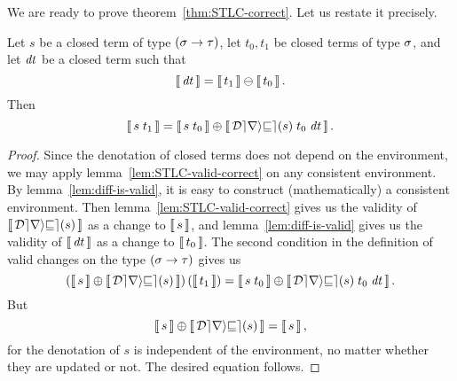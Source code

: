 We are ready to prove theorem~\ref{thm:STLC-correct}. Let us
restate it precisely.

\begin{theorem}
Let $s$ be a closed term of type $(\sigma\to\tau)$, let $t_0,t_1$ be
closed terms of type $\sigma$, and let $\mathit{dt}$ be a closed term
such that
\[
\mean{\D t} = \Diff{\mean{t_1}}{\mean{t_0}}.
\]
Then
\[
\mean{\App s {t_1}} =
\Apply{\mean{\App{\App{\Derive s}{t_0}}{\D t}}}
      {\mean{\App s {t_0}}}.
\]
\end{theorem}

\begin{proof}
Since the denotation of closed terms does not depend on the
environment, we may apply lemma~\ref{lem:STLC-valid-correct} on
any consistent environment. By lemma~\ref{lem:diff-is-valid}, it
is easy to construct (mathematically) a consistent environment.
Then lemma~\ref{lem:STLC-valid-correct} gives us the validity of
$\mean{\Derive s}$ as a change to $\mean s$, and
lemma~\ref{lem:diff-is-valid} gives us the validity of $\mean{\D
t}$ as a change to $\mean{t_0}$. The second condition in the
definition of valid changes on the type $(\sigma\to\tau)$ gives us
\[
\Apply*{\mean{\Derive s}}{\mean s}(\mean{t_1})
=
\Apply{\mean{\App{\App{\Derive s}{t_0}}{\D t}}}
      {\mean{\App s {t_0}}}.
\]
But
\[
\Apply{\mean{\Derive s}}{\mean s} = \mean s,
\]
for the denotation of $s$ is independent of the environment, no
matter whether they are updated or not. The desired equation
follows.
\end{proof}
